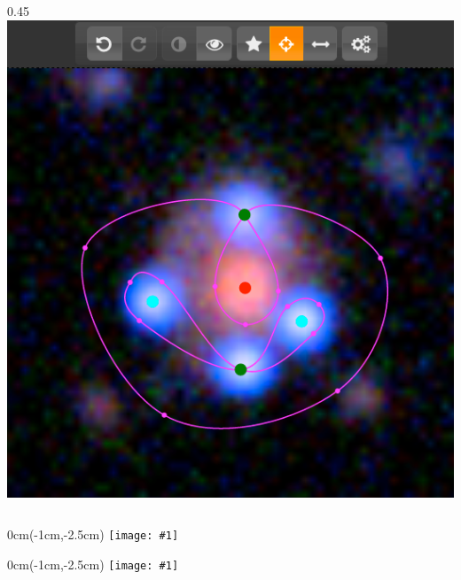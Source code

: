 \documentclass{beamer}
\newcommand{\imgframe}[1]{%
  \begin{frame}%
	\begin{textblock*}{0cm}(-1cm,-2.5cm)%
      \texttt{[image: \#1]}%
	\end{textblock*}%
  \end{frame}%
}
\begin{document}
\begin{frame}
\begin{columns}[c]
\begin{column}{0.45\textwidth}
	  	\includegraphics[width=\textwidth]{imgs/screenshot}
  	\end{column}
  \end{columns}
\end{frame}


\imgframe{imgs/fig0}
\imgframe{imgs/fig3}
\end{document}

